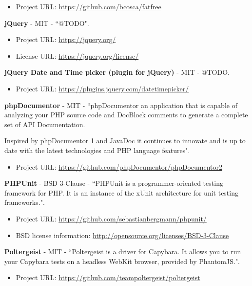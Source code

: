 \begin{itemize}
\item Project URL: \url{https://github.com/bcosca/fatfree}
\end{itemize}

\textbf{jQuery} - MIT - ``@TODO".

\begin{itemize}
\item Project URL: \url{https://jquery.org/}
\item License URL: \url{https://jquery.org/license/}
\end{itemize}

\textbf{jQuery Date and Time picker (plugin for jQuery)} - MIT - @TODO.

\begin{itemize}
\item Project URL: \url{https://plugins.jquery.com/datetimepicker/}
\end{itemize}

\textbf{phpDocumentor} - MIT - ``phpDocumentor an application that is capable of analyzing your PHP source code and DocBlock comments to generate a complete set of API Documentation.

Inspired by phpDocumentor 1 and JavaDoc it continues to innovate and is up to date with the latest technologies and PHP language features".

\begin{itemize}
\item Project URL: \url{https://github.com/phpDocumentor/phpDocumentor2}
\end{itemize}

\textbf{PHPUnit} - BSD 3-Clause - ``PHPUnit is a programmer-oriented testing framework for PHP. It is an instance of the xUnit architecture for unit testing frameworks.".

\begin{itemize}
\item Project URL: \url{https://github.com/sebastianbergmann/phpunit/}
\item BSD license information: \url{http://opensource.org/licenses/BSD-3-Clause}
\end{itemize}

\textbf{Poltergeist} - MIT - ``Poltergeist is a driver for Capybara. It allows you to run your Capybara tests on a headless WebKit browser, provided by PhantomJS.".

\begin{itemize}
\item Project URL: \url{https://github.com/teampoltergeist/poltergeist}
\end{itemize}

